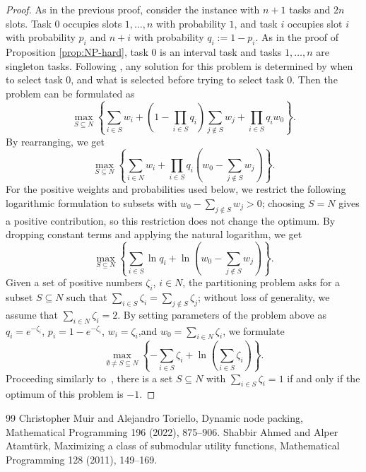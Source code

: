 \documentclass[10pt,a4paper]{amsart}
\theoremstyle{plain}
\theoremstyle{definition}
\theoremstyle{remark}
\begin{document}
\begin{proof}
    As in the previous proof, consider the instance with $n+1$ tasks and $2n$ slots. 
    Task $0$ occupies slots $1,\ldots,n$ with probability $1$, and task $i$ occupies slot $i$ with probability $p_i$ and $n+i$ with probability $q_i:=1-p_i$. {As in the proof of Proposition \ref{prop:NP-hard}, task $0$ is an interval task and tasks $1,\ldots,n$ are singleton tasks.}
    Following \cite{DNP}, any solution for this problem is determined by when to select task $0$, and what is selected before trying to select task $0$.
    Then the problem can be formulated as
    \begin{equation}
    \label{Conserv-JS}
    \tag{Conserv-JS}
    \max_{S\subseteq N}\left\{\sum_{i\in S}w_i+(1-\prod_{i\in S}q_i)\sum_{j\notin S}w_j+\prod_{i\in S}q_i{w_0}\right\}.
    \end{equation}
    By rearranging, we get 
    \[
    \max_{S\subseteq N}\left\{\sum_{i\in N}w_i+\prod_{i\in S}q_i(w_0-\sum_{j\notin S}w_j)\right\}.
    \]
    {For the positive weights and probabilities used below, we restrict the following logarithmic formulation to subsets with $w_0-\sum_{j\notin S}w_j>0$; choosing $S=N$ gives a positive contribution, so this restriction does not change the optimum.}
    By dropping constant terms and applying the natural logarithm, we get 
    \[\max_{S\subseteq N}\left\{\sum_{i\in S}\ln q_i+\ln(w_0-\sum_{j\notin S}w_j)\right\}.\]
    Given a set of positive numbers $\zeta_i$, $i \in N$, the partitioning problem asks for a subset $S \subseteq N$ such that $\sum_{i\in S} \zeta_i = \sum_{j\notin S} \zeta_j$; without loss of generality, we assume that $\sum_{i\in N} \zeta_i = 2$.
    By setting parameters of the problem above as $q_i = e^{- \zeta_i}$, $p_i = 1-e^{-\zeta_i}$, $w_i =\zeta_i$,and $w_0 = \sum_{i\in N} \zeta_i$, we formulate
    \[\max_{{\emptyset\ne S\subseteq N}}\left\{-\sum_{i\in S} \zeta_i+\ln(\sum_{i \in S} \zeta_i)\right\}.\]
Proceeding similarly to~\cite{Star-Graph-NP-hard}, there is a set $S \subseteq N$ with $\sum_{i\in S} \zeta_i=1$ if and only if the optimum of this problem is $-1$.
\end{proof}

\begin{thebibliography}{99}
 Christopher Muir and Alejandro Toriello, Dynamic node packing, Mathematical Programming 196 (2022), 875--906.
 Shabbir Ahmed and Alper Atamt\"{u}rk, Maximizing a class of submodular utility functions, Mathematical Programming 128 (2011), 149--169.
\end{thebibliography}
\end{document}
